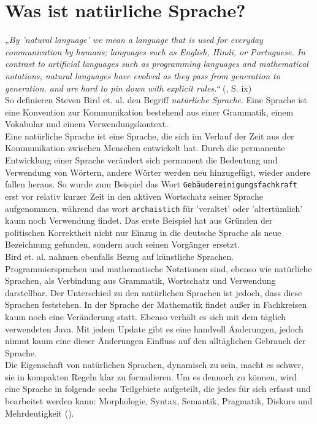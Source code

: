 \documentclass[12pt,twoside]{article}
\theoremstyle{plain}
\theoremstyle{definition}
\theoremstyle{remark}
\begin{document}
\section{Was ist natürliche Sprache?}
\label{sec:def_lang}
\textit{„By 'natural language' we mean a language that is used for everyday communication by humans; languages such as English, Hindi, or Portuguese.
        In contrast to artificial languages such as programming languages and mathematical notations, natural languages have evolved as they pass from generation to generation.
        and are hard to pin down with explicit rules.“} (\cite{Bird2009}, S. ix)\\
So definieren Steven Bird et. al. den Begriff \textit{natürliche Sprache}.
Eine Sprache ist eine Konvention zur Kommunikation bestehend aus einer Grammatik, einem Vokabular und einem Verwendungskontext. \\
Eine natürliche Sprache ist eine Sprache, die sich im Verlauf der Zeit aus der Kommunikation zwischen Menschen entwickelt hat.
Durch die permanente Entwicklung einer Sprache verändert sich permanent die Bedeutung und Verwendung von Wörtern, andere Wörter werden neu hinzugefügt, wieder andere fallen heraus.
So wurde zum Beispiel das Wort \texttt{Gebäudereinigungsfachkraft} erst vor relativ kurzer Zeit in den aktiven Wortschatz seiner Sprache aufgenommen, während das wort \texttt{archaistich} für 'veraltet' oder 'altertümlich' kaum noch Verwendung findet.
Das erste Beispiel hat aus Gründen der politischen Korrektheit nicht nur Einzug in die deutsche Sprache als neue Bezeichnung gefunden, sondern auch seinen Vorgänger ersetzt.\\
Bird et. al. nahmen ebenfalls Bezug auf künstliche Sprachen.
Programmiersprachen und mathematische Notationen sind, ebenso wie natürliche Sprachen, als Verbindung aus Grammatik, Wortschatz und Verwendung darstellbar.
Der Unterschied zu den natürlichen Sprachen ist jedoch, dass diese Sprachen feststehen.
In der Sprache der Mathematik findet außer in Fachkreisen kaum noch eine Veränderung statt.
Ebenso verhält es sich mit dem täglich verwendeten Java.
Mit jedem Update gibt es eine handvoll Änderungen, jedoch nimmt kaum eine dieser Änderungen Einfluss auf den alltäglichen Gebrauch der Sprache.\\
Die Eigenschaft von natürlichen Sprachen, dynamisch zu sein, macht es schwer, sie in kompakten Regeln klar zu formulieren.
Um es dennoch zu können, wird eine Sprache in folgende sechs Teilgebiete aufgeteilt, die jedes für sich erfasst und bearbeitet werden kann:
Morphologie, Syntax, Semantik, Pragmatik, Diskurs und Mehrdeutigkeit (\cite{Jur2009}).\\
\end{document}
